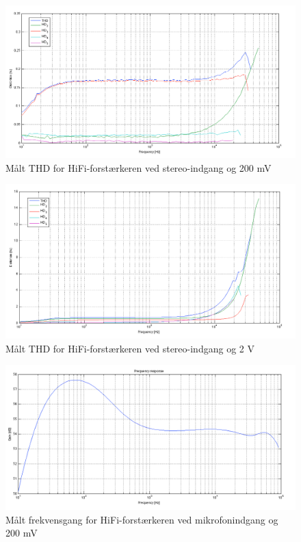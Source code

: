 \begin{figure}[h]
\centering
\includegraphics[width=\textwidth]{maalerapporter/final/stereo/final_stereo_200mv_thd.png}
\caption{Målt THD for HiFi-forstærkeren ved stereo-indgang og 200 mV}
\label{maalerapport_final3}
\end{figure}

\begin{figure}[h]
\centering
\includegraphics[width=\textwidth]{maalerapporter/final/stereo/final_stereo_2v_thd.png}
\caption{Målt THD for HiFi-forstærkeren ved stereo-indgang og 2 V}
\label{maalerapport_final4}
\end{figure}

\begin{figure}[h]
\centering
\includegraphics[width=\textwidth]{maalerapporter/final/mic/final_mic_3,16mv_frekvensgang.png}
\caption{Målt frekvensgang for HiFi-forstærkeren ved mikrofonindgang og 200 mV}
\label{maalerapport_final5}
\end{figure}

